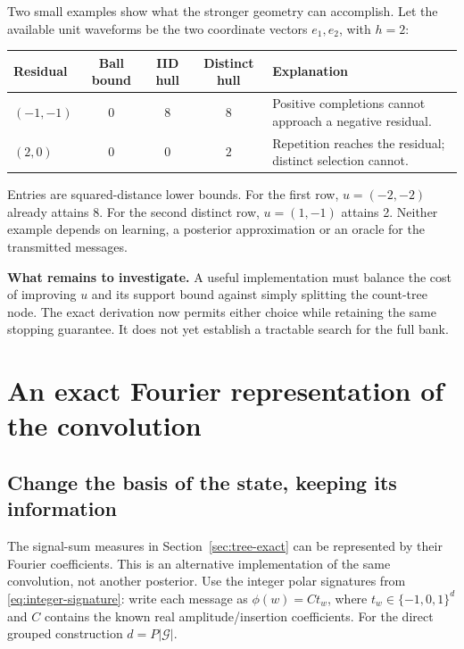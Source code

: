 \documentclass[10pt,a4paper]{article}
\begin{document}
Two small examples show what the stronger geometry can accomplish. Let the available unit waveforms be the
two coordinate vectors $e_1,e_2$, with $h=2$:
\begin{center}
\begin{tabularx}{\textwidth}{@{}lcccY@{}}\toprule
Residual & Ball bound & IID hull & Distinct hull & Explanation\\\midrule
$(-1,-1)$ & $0$ & $8$ & $8$ & Positive completions cannot approach a negative residual.\\
$(2,0)$ & $0$ & $0$ & $2$ & Repetition reaches the residual; distinct selection cannot.\\\bottomrule
\end{tabularx}
\end{center}
Entries are squared-distance lower bounds. For the first row, $u=(-2,-2)$ already attains 8.
For the second distinct row, $u=(1,-1)$ attains 2.
Neither example depends on learning, a posterior approximation or an oracle for the transmitted messages.

\textbf{What remains to investigate.} A useful implementation must balance the cost of improving $u$ and its
support bound against simply splitting the count-tree node. The exact derivation now permits either choice
while retaining the same stopping guarantee. It does not yet establish a tractable search for the full bank.

\clearpage
\section{An exact Fourier representation of the convolution}
\label{sec:fourier-exact}
\subsection{Change the basis of the state, keeping its information}
The signal-sum measures in Section~\ref{sec:tree-exact} can be represented by their Fourier coefficients.
This is an alternative implementation of the same convolution, not another posterior.
Use the integer polar signatures from \eqref{eq:integer-signature}: write each message as
$\phi(w)=C t_w$, where $t_w\in\{-1,0,1\}^d$ and $C$ contains the known real amplitude/insertion coefficients.
For the direct grouped construction $d=P|\mathcal G|$.
\end{document}
